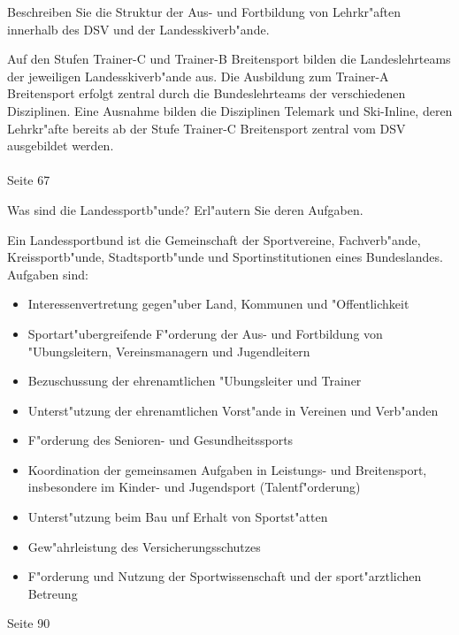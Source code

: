 \begin{question}{3}
Beschreiben Sie die Struktur der Aus- und Fortbildung von Lehrkr"aften innerhalb des DSV und der Landesskiverb"ande.
\end{question}
\begin{solution}
Auf den Stufen Trainer-C und Trainer-B Breitensport bilden die Landeslehrteams der jeweiligen Landesskiverb"ande aus. Die Ausbildung zum Trainer-A Breitensport erfolgt zentral durch die Bundeslehrteams der verschiedenen Disziplinen. Eine Ausnahme bilden die Disziplinen Telemark und Ski-Inline, deren Lehrkr"afte bereits ab der Stufe Trainer-C Breitensport zentral vom DSV ausgebildet werden.\\\\
 Seite 67
\end{solution}

\begin{question}{5}
Was sind die Landessportb"unde? Erl"autern Sie deren Aufgaben.
\end{question}
\begin{solution}
Ein Landessportbund ist die Gemeinschaft der Sportvereine, Fachverb"ande, Kreissportb"unde, Stadtsportb"unde und Sportinstitutionen eines Bundeslandes.\\
Aufgaben sind:
\begin{itemize}
\item Interessenvertretung gegen"uber Land, Kommunen und "Offentlichkeit
\item Sportart"ubergreifende F"orderung der Aus- und Fortbildung von "Ubungsleitern, Vereinsmanagern und Jugendleitern
\item Bezuschussung der ehrenamtlichen "Ubungsleiter und Trainer
\item Unterst"utzung der ehrenamtlichen Vorst"ande in Vereinen und Verb"anden
\item F"orderung des Senioren- und Gesundheitssports
\item Koordination der gemeinsamen Aufgaben in Leistungs- und Breitensport, insbesondere im Kinder- und Jugendsport (Talentf"orderung)
\item Unterst"utzung beim Bau unf Erhalt von Sportst"atten
\item Gew"ahrleistung des Versicherungsschutzes
\item F"orderung und Nutzung der Sportwissenschaft und der sport"arztlichen Betreung
\end{itemize}
 Seite 90
\end{solution}